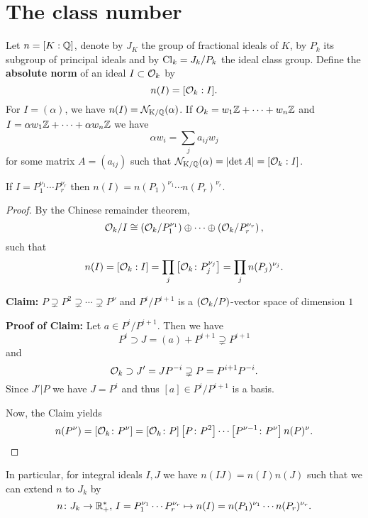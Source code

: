 \section{The class number}
Let $n=[K:\mathbb{Q}]$, denote by $J_K$ the group of fractional ideals of $K$, by $P_k$ its subgroup of principal ideals and by $\operatorname{Cl}_k = J_k / P_k$ the ideal class group.
Define the \textbf{absolute norm} of an ideal $I \subset \mathcal{O}_k$ by
\[ n(I) = [\mathcal{O}_k : I].
\]
For $I=(\alpha)$, we have $n(I) =\operatorname{\mathcal{N}_{K/\mathbb{Q}}}(\alpha)$. If $O_k = w_1\mathbb{Z}+ \dots + w_n \mathbb{Z}$ and $I = \alpha w_1\mathbb{Z} + \dots + \alpha w_n \mathbb{Z}$ we have 
\[ \alpha w_i = \sum_j a_{ij} w_j
\]
for some matrix $A=(a_{ij})$ such that $\operatorname{\mathcal{N}_{K/\mathbb{Q}}}(\alpha) = \left|{\det A}\right| =[\mathcal{O}_k:I]$.

\begin{Prop}
If $I = P_1^{\nu_1} \cdots P_r^{\nu_r}$ then $n(I) =n(P_1)^{\nu_1} \cdots n(P_r)^{\nu_r}$.
\end{Prop}

\begin{proof}By the Chinese remainder theorem,
\[ \mathcal{O}_k / I \cong \left( \mathcal{O}_k / P_1^{\nu_1} \right) \oplus \cdots \oplus \left( \mathcal{O}_k / P_r^{\nu_r} \right),
\]
such that
\[n(I) = [\mathcal{O}_k:I]
=\prod_j \left[ \mathcal{O}_k \colon P_j^{\nu_j}  \right]
=\prod_j n(P_j)^{\nu_j}.
\]

\textbf{Claim:} $P \supsetneq P^2 \supsetneq \cdots \supsetneq P^\nu $
and $P^i / P^{i+1}$ is a $(\mathcal{O}_k / P)$-vector space of dimension $1$

\textbf{Proof of Claim:}
Let $a \in P^i / P^{i+1}$. Then we have
\[ P^i \supset J=(a) +P^{i+1} \supsetneq P^{i+1}
\]
and
\[ \mathcal{O}_k \supset J' = JP^{-i} \supsetneq P = P^{i+1}P^{-i}.
\]
Since $J' | P$ we have $J=P^i$ and thus $[a] \in P^i /P^{i+1}$ is a basis.

\bigskip
Now, the Claim yields
\[ n(P^\nu) 
= \left[\mathcal{O}_k\colon P^\nu\right]
= \left[\mathcal{O}_k\colon P\right]  \left[P\colon P^2\right] \cdots \left[P^{\nu-1}\colon P^\nu\right]
n(P)^\nu.
\]
\end{proof}

In particular, for integral ideals $I, J$ we have $n(IJ)=n(I)n(J)$ such that we can extend $n$ to $J_k$ by
\[n \colon J_k \to \mathbb{R}_+^*, \,
I = P_1^{\nu_1} \cdots P_r^{\nu_r} \mapsto n(I)= n(P_1)^{\nu_1} \cdots n(P_r)^{\nu_r}.
\]













